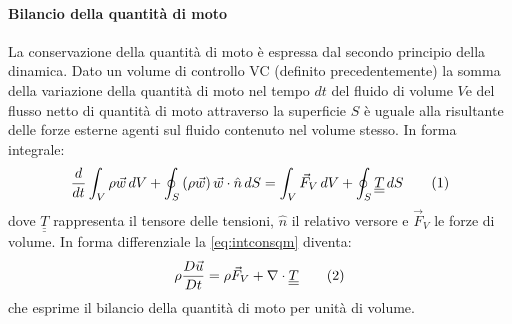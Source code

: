 \paragraph{Bilancio della quantità di moto}
La conservazione della quantità di moto è espressa dal secondo principio della dinamica. Dato un volume di controllo VC (definito precedentemente) la somma della variazione  della quantità di moto nel tempo \(dt\) del fluido di volume \(V\)e del flusso netto di quantità di moto attraverso la superficie \(S\) è uguale alla risultante delle forze esterne agenti sul fluido contenuto nel volume stesso.
In forma integrale:
\[\frac{d}{dt} \int_V \rho \vec w \, dV + \oint_S \left( \rho \vec w \right) \vec w \cdot \hat n \, dS = \int_V \vec F_V \, dV + \oint_S \underline{\underline T }\,dS \addtag \label{eq:intconsqm} \]
dove \(\underline{\underline T }\) rappresenta il tensore delle tensioni, \(\hat n\) il relativo versore e \(\vec F_V\) le forze di volume. In forma differenziale la \eqref{eq:intconsqm} diventa:
\[\rho \frac{D \vec u}{Dt} = \rho \vec F_V + \nabla \cdot \underline{\underline T } \addtag \]
che esprime il bilancio della quantità di moto per unità di volume.

